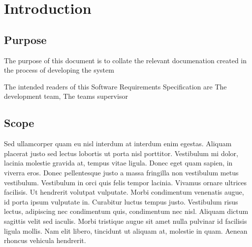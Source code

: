 
\chapter{Introduction} %

\label{Part1Chapter1} %




\section{Purpose}

The purpose of this document is to collate the relevant documenation created in the process of developing the system

The intended readers of this Software Requirements Specification are The development team, The teams supervisor 


\section{Scope}

Sed ullamcorper quam eu nisl interdum at interdum enim egestas. Aliquam placerat justo sed lectus lobortis ut porta nisl porttitor. Vestibulum mi dolor, lacinia molestie gravida at, tempus vitae ligula. Donec eget quam sapien, in viverra eros. Donec pellentesque justo a massa fringilla non vestibulum metus vestibulum. Vestibulum in orci quis felis tempor lacinia. Vivamus ornare ultrices facilisis. Ut hendrerit volutpat vulputate. Morbi condimentum venenatis augue, id porta ipsum vulputate in. Curabitur luctus tempus justo. Vestibulum risus lectus, adipiscing nec condimentum quis, condimentum nec nisl. Aliquam dictum sagittis velit sed iaculis. Morbi tristique augue sit amet nulla pulvinar id facilisis ligula mollis. Nam elit libero, tincidunt ut aliquam at, molestie in quam. Aenean rhoncus vehicula hendrerit.

